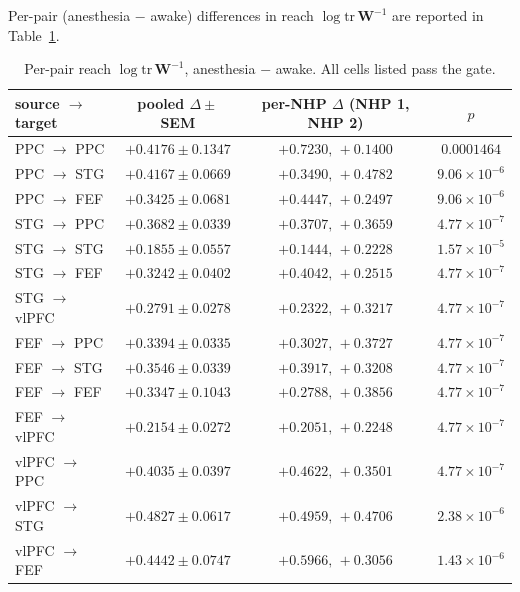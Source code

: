 Per-pair (anesthesia $-$ awake) differences in reach $\log\mathrm{tr}\,\mathbf{W}^{-1}$ are reported in Table~\ref{tab:supp-interareal-control-reach-Winv}.

\begin{table}[h!]
\centering
\small
\caption[Per-pair reach $\log\mathrm{tr}\,\mathbf{W}^{-1}$]{Per-pair reach $\log\mathrm{tr}\,\mathbf{W}^{-1}$, anesthesia $-$ awake. All cells listed pass the gate.}
\label{tab:supp-interareal-control-reach-Winv}
\begin{tabular}{lccc}
\toprule
source $\to$ target & pooled $\Delta\pm$SEM & per-NHP $\Delta$ (NHP 1, NHP 2) & $p$ \\
\midrule
PPC $\to$ PPC   & $+0.4176\pm 0.1347$ & $+0.7230,\,+0.1400$ & $0.0001464$ \\
PPC $\to$ STG   & $+0.4167\pm 0.0669$ & $+0.3490,\,+0.4782$ & $9.06\!\times\!10^{-6}$ \\
PPC $\to$ FEF   & $+0.3425\pm 0.0681$ & $+0.4447,\,+0.2497$ & $9.06\!\times\!10^{-6}$ \\
STG $\to$ PPC   & $+0.3682\pm 0.0339$ & $+0.3707,\,+0.3659$ & $4.77\!\times\!10^{-7}$ \\
STG $\to$ STG   & $+0.1855\pm 0.0557$ & $+0.1444,\,+0.2228$ & $1.57\!\times\!10^{-5}$ \\
STG $\to$ FEF   & $+0.3242\pm 0.0402$ & $+0.4042,\,+0.2515$ & $4.77\!\times\!10^{-7}$ \\
STG $\to$ vlPFC & $+0.2791\pm 0.0278$ & $+0.2322,\,+0.3217$ & $4.77\!\times\!10^{-7}$ \\
FEF $\to$ PPC   & $+0.3394\pm 0.0335$ & $+0.3027,\,+0.3727$ & $4.77\!\times\!10^{-7}$ \\
FEF $\to$ STG   & $+0.3546\pm 0.0339$ & $+0.3917,\,+0.3208$ & $4.77\!\times\!10^{-7}$ \\
FEF $\to$ FEF   & $+0.3347\pm 0.1043$ & $+0.2788,\,+0.3856$ & $4.77\!\times\!10^{-7}$ \\
FEF $\to$ vlPFC & $+0.2154\pm 0.0272$ & $+0.2051,\,+0.2248$ & $4.77\!\times\!10^{-7}$ \\
vlPFC $\to$ PPC & $+0.4035\pm 0.0397$ & $+0.4622,\,+0.3501$ & $4.77\!\times\!10^{-7}$ \\
vlPFC $\to$ STG & $+0.4827\pm 0.0617$ & $+0.4959,\,+0.4706$ & $2.38\!\times\!10^{-6}$ \\
vlPFC $\to$ FEF & $+0.4442\pm 0.0747$ & $+0.5966,\,+0.3056$ & $1.43\!\times\!10^{-6}$ \\
\bottomrule
\end{tabular}
\end{table}

